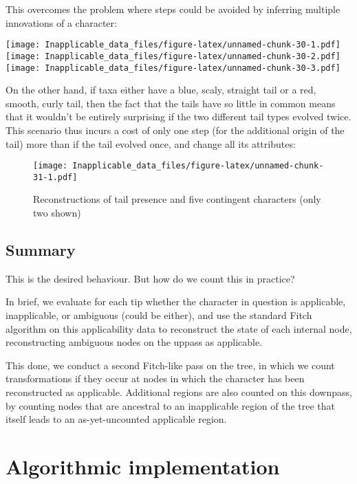 \documentclass[]{book}
\theoremstyle{definition}
\theoremstyle{definition}
\theoremstyle{definition}
\theoremstyle{remark}
\begin{document}
This overcomes the problem where steps could be avoided by inferring
multiple innovations of a character:

\texttt{[image: Inapplicable\_data\_files/figure-latex/unnamed-chunk-30-1.pdf]}
\texttt{[image: Inapplicable\_data\_files/figure-latex/unnamed-chunk-30-2.pdf]}
\texttt{[image: Inapplicable\_data\_files/figure-latex/unnamed-chunk-30-3.pdf]}

On the other hand, if taxa either have a blue, scaly, straight tail or a
red, smooth, curly tail, then the fact that the tails have so little in
common means that it wouldn't be entirely surprising if the two
different tail types evolved twice. This scenario thus incurs a cost of
only one step (for the additional origin of the tail) more than if the
tail evolved once, and change all its attributes:

\begin{figure}
\centering
\texttt{[image: Inapplicable\_data\_files/figure-latex/unnamed-chunk-31-1.pdf]}
\caption{\label{fig:unnamed-chunk-31}Reconstructions of tail presence and
five contingent characters (only two shown)}
\end{figure}

\hypertarget{summary}{%
\subsection{Summary}\label{summary}}

This is the desired behaviour. But how do we count this in practice?

In brief, we evaluate for each tip whether the character in question is
applicable, inapplicable, or ambiguous (could be either), and use the
standard Fitch algorithm on this applicability data to reconstruct the
state of each internal node, reconstructing ambiguous nodes on the
uppass as applicable.

This done, we conduct a second Fitch-like pass on the tree, in which we
count transformations if they occur at nodes in which the character has
been reconstructed as applicable. Additional regions are also counted on
this downpass, by counting nodes that are ancestral to an inapplicable
region of the tree that itself leads to an as-yet-uncounted applicable
region.

\hypertarget{algorithm}{%
\section{Algorithmic implementation}\label{algorithm}}
\end{document}
